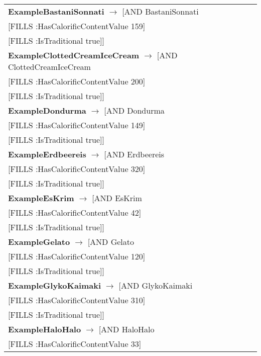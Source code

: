 \documentclass[12pt]{article}
\newcommand*{\MyIndent}{\hspace*{7em}}
\begin{document}
\begin{tabularx}{1\textwidth}{@{}X@{}}
            \textbf{ExampleBastaniSonnati} $\rightarrow$ [AND BastaniSonnati \\
                            \MyIndent [FILLS :HasCalorificContentValue 159] \\
                            \MyIndent [FILLS :IsTraditional true]]
                            \tabularnewline
            \textbf{ExampleClottedCreamIceCream} $\rightarrow$ [AND ClottedCreamIceCream \\
                            \MyIndent [FILLS :HasCalorificContentValue 200] \\
                            \MyIndent [FILLS :IsTraditional true]]
                            \tabularnewline
            \textbf{ExampleDondurma} $\rightarrow$ [AND Dondurma \\
                            \MyIndent [FILLS :HasCalorificContentValue 149] \\
                            \MyIndent [FILLS :IsTraditional true]]
                            \tabularnewline
            \textbf{ExampleErdbeereis} $\rightarrow$ [AND Erdbeereis \\
                            \MyIndent [FILLS :HasCalorificContentValue 320] \\
                            \MyIndent [FILLS :IsTraditional true]]
                            \tabularnewline
            \textbf{ExampleEsKrim} $\rightarrow$ [AND EsKrim \\
                            \MyIndent [FILLS :HasCalorificContentValue 42] \\
                            \MyIndent [FILLS :IsTraditional true]]
                            \tabularnewline
            \textbf{ExampleGelato} $\rightarrow$ [AND Gelato \\
                            \MyIndent [FILLS :HasCalorificContentValue 120] \\
                            \MyIndent [FILLS :IsTraditional true]]
                            \tabularnewline
            \textbf{ExampleGlykoKaimaki} $\rightarrow$ [AND GlykoKaimaki \\
                            \MyIndent [FILLS :HasCalorificContentValue 310] \\
                            \MyIndent [FILLS :IsTraditional true]]
                            \tabularnewline
            \textbf{ExampleHaloHalo} $\rightarrow$ [AND HaloHalo \\
                            \MyIndent [FILLS :HasCalorificContentValue 33] \\

\end{tabularx}
\end{document}
